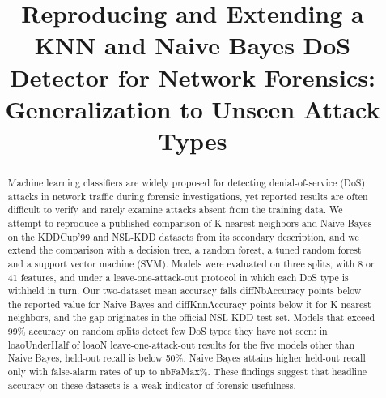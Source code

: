 \documentclass[conference]{IEEEtran}
\newcommand{\nm}[1]{\csname #1\endcsname}
\begin{document}
\title{Reproducing and Extending a KNN and Naive Bayes DoS Detector for Network Forensics: Generalization to Unseen Attack Types}

\author{
  \and
}

\maketitle

\begin{abstract}
Machine learning classifiers are widely proposed for detecting denial-of-service (DoS) attacks in network traffic during forensic investigations, yet reported results are often difficult to verify and rarely examine attacks absent from the training data. We attempt to reproduce a published comparison of K-nearest neighbors and Naive Bayes on the KDDCup'99 and NSL-KDD datasets from its secondary description, and we extend the comparison with a decision tree, a random forest, a tuned random forest and a support vector machine (SVM). Models were evaluated on three splits, with 8 or 41 features, and under a leave-one-attack-out protocol in which each DoS type is withheld in turn. Our two-dataset mean accuracy falls \nm{diffNbAccuracy} points below the reported value for Naive Bayes and \nm{diffKnnAccuracy} points below it for K-nearest neighbors, and the gap originates in the official NSL-KDD test set. Models that exceed 99\% accuracy on random splits detect few DoS types they have not seen: in \nm{loaoUnderHalf} of \nm{loaoN} leave-one-attack-out results for the five models other than Naive Bayes, held-out recall is below 50\%. Naive Bayes attains higher held-out recall only with false-alarm rates of up to \nm{nbFaMax}\%. These findings suggest that headline accuracy on these datasets is a weak indicator of forensic usefulness.
\end{abstract}
\end{document}
